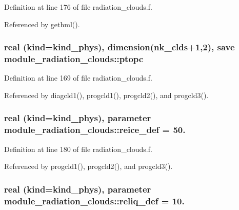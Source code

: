 Definition at line 176 of file radiation\+\_\+clouds.\+f.



Referenced by gethml().

\subsubsection[{\texorpdfstring{ptopc}{ptopc}}]{\setlength{\rightskip}{0pt plus 5cm}real (kind=kind\+\_\+phys), dimension({\bf nk\+\_\+clds}+1,2), save module\+\_\+radiation\+\_\+clouds\+::ptopc\hspace{0.3cm}{\ttfamily [private]}}\hypertarget{namespacemodule__radiation__clouds_a03bc5d19cbdc84a2032c8d591ba4c96a}{}\label{namespacemodule__radiation__clouds_a03bc5d19cbdc84a2032c8d591ba4c96a}


Definition at line 169 of file radiation\+\_\+clouds.\+f.



Referenced by diagcld1(), progcld1(), progcld2(), and progcld3().

\subsubsection[{\texorpdfstring{reice\+\_\+def}{reice_def}}]{\setlength{\rightskip}{0pt plus 5cm}real (kind=kind\+\_\+phys), parameter module\+\_\+radiation\+\_\+clouds\+::reice\+\_\+def = 50.\hspace{0.3cm}{\ttfamily [private]}}\hypertarget{namespacemodule__radiation__clouds_a721e0fb4a34774f5b61f567b9cad8e7b}{}\label{namespacemodule__radiation__clouds_a721e0fb4a34774f5b61f567b9cad8e7b}


Definition at line 180 of file radiation\+\_\+clouds.\+f.



Referenced by progcld1(), progcld2(), and progcld3().

\subsubsection[{\texorpdfstring{reliq\+\_\+def}{reliq_def}}]{\setlength{\rightskip}{0pt plus 5cm}real (kind=kind\+\_\+phys), parameter module\+\_\+radiation\+\_\+clouds\+::reliq\+\_\+def = 10.\hspace{0.3cm}{\ttfamily [private]}}\hypertarget{namespacemodule__radiation__clouds_a1768a85f4d8af2ad40b62ae6e6667c1e}{}\label{namespacemodule__radiation__clouds_a1768a85f4d8af2ad40b62ae6e6667c1e}


